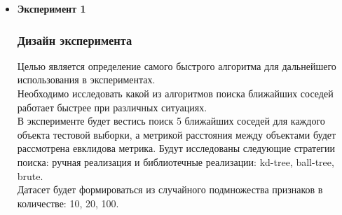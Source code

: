 \documentclass[10pt]{article}
\begin{document}
	\begin{itemize}
		\item {\bf Эксперимент 1}
			\subsubsection*{Дизайн эксперимента}
			{
				Целью является определение самого быстрого алгоритма для дальнейшего использования в экспериментах.\\
				Необходимо исследовать какой из алгоритмов поиска ближайших соседей работает быстрее при различных ситуациях.\\
				В эксперименте будет вестись поиск 5 ближайших соседей для каждого объекта тестовой выборки, а метрикой расстояния между объектами будет рассмотрена евклидова метрика. Будут исследованы следующие стратегии поиска: ручная реализация и библиотечные реализации: kd-tree, ball-tree, brute.\\
				Датасет будет формироваться из случайного подмножества признаков в количестве: 10, 20, 100.
	        }
	        

\end{itemize}
\end{document}
